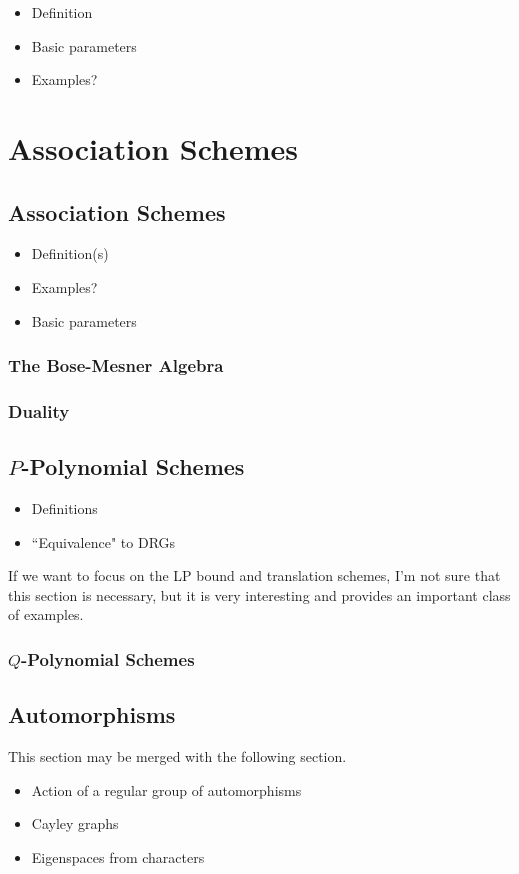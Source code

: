 \documentclass{report}
\begin{document}
    \begin{itemize}
      \item Definition
      \item Basic parameters
      \item Examples?
    \end{itemize}

\chapter{Association Schemes}
  \section{Association Schemes}
    \begin{itemize}
      \item Definition(s)
      \item Examples?
      \item Basic parameters
    \end{itemize}

    \subsection{The Bose-Mesner Algebra}

    \subsection{Duality}

  \section{$P$-Polynomial Schemes}
    \begin{itemize}
      \item Definitions
      \item ``Equivalence" to DRGs
    \end{itemize}

    If we want to focus on the LP bound and translation schemes, I'm not sure
    that this section is necessary, but it is very interesting and provides an
    important class of examples.

    \subsection{$Q$-Polynomial Schemes}

  \section{Automorphisms}
    This section may be merged with the following section.
    \begin{itemize}
      \item Action of a regular group of automorphisms
      \item Cayley graphs
      \item Eigenspaces from characters
    \end{itemize}
\end{document}
